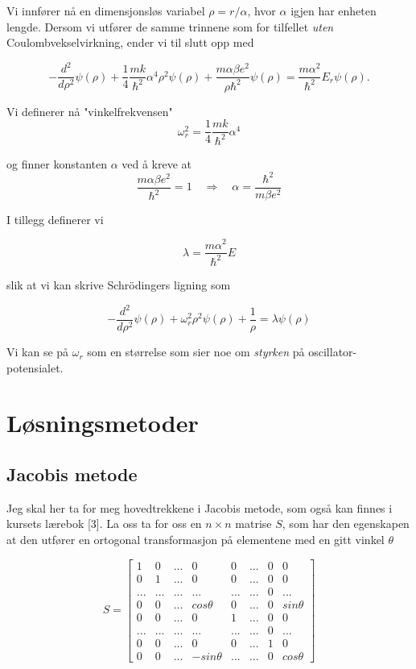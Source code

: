 \documentclass{article}
\begin{document}
Vi innfører nå en dimensjonsløs variabel $\rho = r/ \alpha$, hvor $\alpha$ igjen har enheten lengde. Dersom vi utfører de samme trinnene som for tilfellet \textit{uten} Coulombvekselvirkning, ender vi til slutt opp med

\begin{equation*}
  -\frac{d^2}{d\rho^2} \psi(\rho) 
       + \frac{1}{4}\frac{mk}{\hbar^2} \alpha^4\rho^2\psi(\rho)+\frac{m\alpha \beta e^2}{\rho\hbar^2}\psi(\rho)  = 
\frac{m\alpha^2}{\hbar^2}E_r \psi(\rho) .
\end{equation*}

Vi definerer nå "vinkelfrekvensen"
\[\omega_r^2 = \frac{1}{4}\frac{mk}{\hbar ^2}\alpha^4 \]

og finner konstanten $\alpha$ ved å kreve at 
\[\frac{m\alpha \beta e^2}{\hbar ^2} = 1 \quad \Rightarrow \quad \alpha = \frac{\hbar ^2}{m\beta e^2}  \]

I tillegg definerer vi 

\[\lambda = \frac{m\alpha ^2}{\hbar ^2}E \]

slik at vi kan skrive Schrödingers ligning som

\begin{equation*}
  -\frac{d^2}{d\rho^2} \psi(\rho) + \omega_r^2\rho^2\psi(\rho) +\frac{1}{\rho} = \lambda \psi(\rho)
\end{equation*}

Vi kan se på $\omega_r$ som en størrelse som sier noe om \textit{styrken} på oscillator-potensialet.


\section{Løsningsmetoder}
\subsection{Jacobis metode}
Jeg skal her ta for meg hovedtrekkene i Jacobis metode, som også kan finnes i kursets lærebok [3].
La oss ta for oss en $n \times n$ matrise $S$, som har den egenskapen at den utfører en ortogonal transformasjon på elementene med en gitt vinkel $\theta$

\[S = \begin{bmatrix} 1&0 &... &0 &0 &... &0 &0 \\ 
0& 1 & ... & 0 & 0 &... &0 &0 \\
 ...& ... & ... & ... & ... & ... & 0 &... \\ 
 0& 0 & ... & cos\theta &0 &... &0 &sin\theta \\
  0& 0 & ... & 0 & 1 & ... & 0 & 0\\ 
  ...& ... & ... & ... & ... & ... & 0 &... \\ 
  0 & 0 & ... & 0 & 0 & ... & 1 & 0\\
   0 & 0 & ... & -sin\theta & ... & ... & 0 & cos\theta \end{bmatrix}\]
\end{document}
